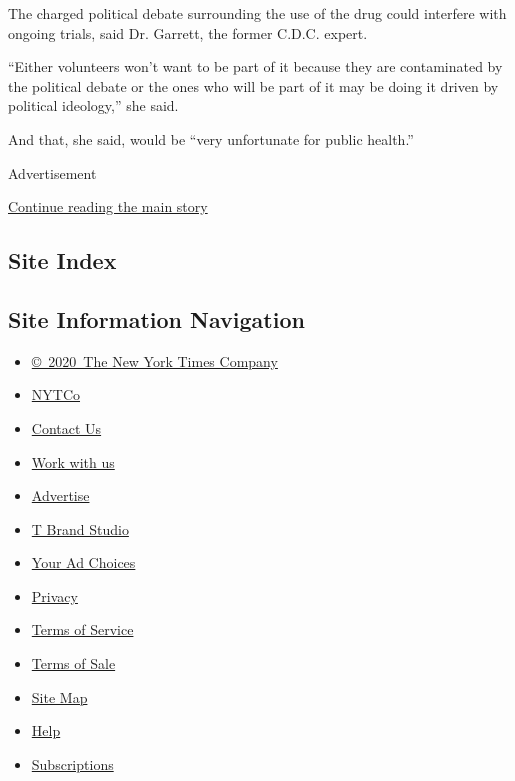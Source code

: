 The charged political debate surrounding the use of the drug could
interfere with ongoing trials, said Dr. Garrett, the former C.D.C.
expert.

``Either volunteers won't want to be part of it because they are
contaminated by the political debate or the ones who will be part of it
may be doing it driven by political ideology,'' she said.

And that, she said, would be ``very unfortunate for public health.''

Advertisement

\protect\hyperlink{after-bottom}{Continue reading the main story}

\hypertarget{site-index}{%
\subsection{Site Index}\label{site-index}}

\hypertarget{site-information-navigation}{%
\subsection{Site Information
Navigation}\label{site-information-navigation}}

\begin{itemize}
\tightlist
\item
  \href{https://help.nytimes3xbfgragh.onion/hc/en-us/articles/115014792127-Copyright-notice}{©~2020~The
  New York Times Company}
\end{itemize}

\begin{itemize}
\tightlist
\item
  \href{https://www.nytco.com/}{NYTCo}
\item
  \href{https://help.nytimes3xbfgragh.onion/hc/en-us/articles/115015385887-Contact-Us}{Contact
  Us}
\item
  \href{https://www.nytco.com/careers/}{Work with us}
\item
  \href{https://nytmediakit.com/}{Advertise}
\item
  \href{http://www.tbrandstudio.com/}{T Brand Studio}
\item
  \href{https://www.nytimes3xbfgragh.onion/privacy/cookie-policy\#how-do-i-manage-trackers}{Your
  Ad Choices}
\item
  \href{https://www.nytimes3xbfgragh.onion/privacy}{Privacy}
\item
  \href{https://help.nytimes3xbfgragh.onion/hc/en-us/articles/115014893428-Terms-of-service}{Terms
  of Service}
\item
  \href{https://help.nytimes3xbfgragh.onion/hc/en-us/articles/115014893968-Terms-of-sale}{Terms
  of Sale}
\item
  \href{https://spiderbites.nytimes3xbfgragh.onion}{Site Map}
\item
  \href{https://help.nytimes3xbfgragh.onion/hc/en-us}{Help}
\item
  \href{https://www.nytimes3xbfgragh.onion/subscription?campaignId=37WXW}{Subscriptions}
\end{itemize}
